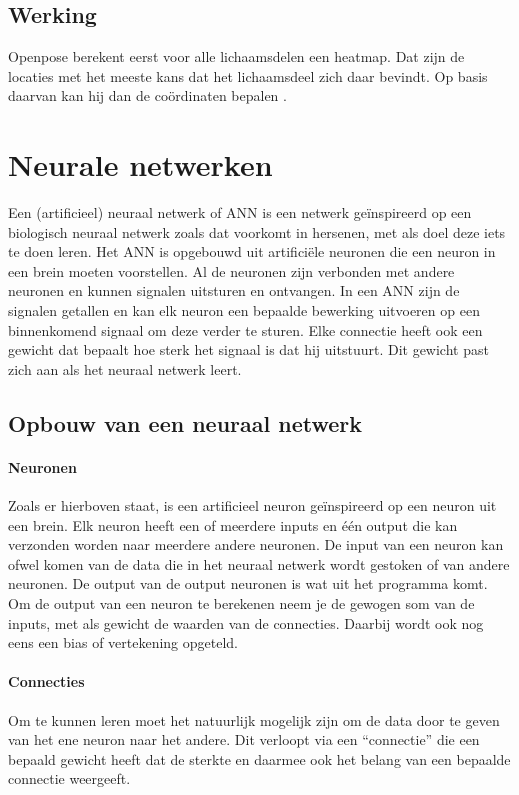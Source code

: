 \documentclass[a4paper,twoside,kulak]{kulakreport}
\begin{document}
\subsection{Werking}
Openpose berekent eerst voor alle lichaamsdelen een heatmap. Dat zijn de locaties met het meeste kans dat het lichaamsdeel zich daar bevindt. Op basis daarvan kan hij dan de coördinaten bepalen \cite{heatmaps}.

\section{Neurale netwerken}
Een (artificieel) neuraal netwerk of ANN is een netwerk geïnspireerd op een biologisch neuraal netwerk zoals dat voorkomt in hersenen, met als doel deze iets te doen leren. Het ANN is opgebouwd uit artificiële neuronen die een neuron in een brein moeten voorstellen. Al de neuronen zijn verbonden met andere neuronen en kunnen signalen uitsturen en ontvangen. In een ANN zijn de signalen getallen en kan elk neuron een bepaalde bewerking uitvoeren op een binnenkomend signaal om deze verder te sturen. Elke connectie heeft ook een gewicht dat bepaalt hoe sterk het signaal is dat hij uitstuurt. Dit gewicht past zich aan als het neuraal netwerk leert. 

\subsection{Opbouw van een neuraal netwerk}
\paragraph{Neuronen}
Zoals er hierboven staat, is een artificieel neuron geïnspireerd op een neuron uit een brein. Elk neuron heeft een of meerdere inputs en één output die kan verzonden worden naar meerdere andere neuronen. De input van een neuron kan ofwel komen van de data die in het neuraal netwerk wordt gestoken of van andere neuronen. De output van de output neuronen is wat uit het programma komt. Om de output van een neuron te berekenen neem je de gewogen som van de inputs, met als gewicht de waarden van de connecties. Daarbij wordt ook nog eens een bias of vertekening opgeteld.

\paragraph{Connecties}
Om te kunnen leren moet het natuurlijk mogelijk zijn om de data door te geven van het ene neuron naar het andere. Dit verloopt via een “connectie” die een bepaald gewicht heeft dat de sterkte en daarmee ook het belang van een bepaalde connectie weergeeft.
\end{document}
